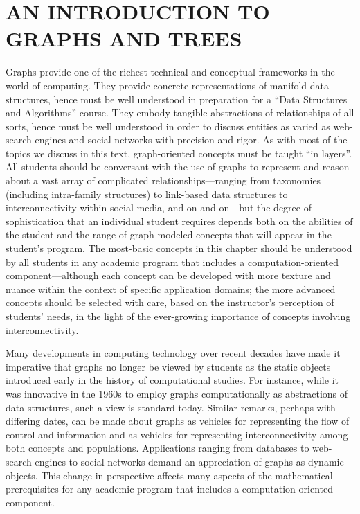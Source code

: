 
\chapter{AN INTRODUCTION TO GRAPHS AND TREES}
\label{Ch:Graphs-Trees}

Graphs provide one of the richest technical and conceptual frameworks
in the world of computing.  They provide concrete representations of
manifold data structures, hence must be well understood in preparation
for a ``Data Structures and Algorithms'' course.  They embody tangible
abstractions of relationships of all sorts, hence must be well
understood in order to discuss entities as varied as web-search
engines and social networks with precision and rigor.  As with most of
the topics we discuss in this text, graph-oriented concepts must be
taught ``in layers''.  All students should be conversant with the use
of graphs to represent and reason about a vast array of complicated
relationships---ranging from taxonomies (including intra-family
structures) to link-based data structures to interconnectivity within
social media, and on and on---but the degree of sophistication that an
individual student requires depends both on the abilities of the
student and the range of graph-modeled concepts that will appear in
the student's program.  The most-basic concepts in this chapter should
be understood by all students in any academic program that includes a
computation-oriented component---although each concept can be
developed with more texture and nuance within the context of specific
application domains; the more advanced concepts should be selected
with care, based on the instructor's perception of students' needs, in
the light of the ever-growing importance of concepts involving
interconnectivity.

Many developments in computing technology over recent decades have
made it imperative that graphs no longer be viewed by students as the
static objects introduced early in the history of computational
studies.  For instance, while it was innovative in the 1960s to employ
graphs computationally as abstractions of data structures, such a view
is standard today.  Similar remarks, perhaps with differing dates, can
be made about graphs as vehicles for representing the flow of control
and information and as vehicles for representing interconnectivity
among both concepts and populations.  Applications ranging from
databases to web-search engines to social networks demand an
appreciation of graphs as dynamic objects.  This change in perspective
affects many aspects of the mathematical prerequisites for any
academic program that includes a computation-oriented component.


